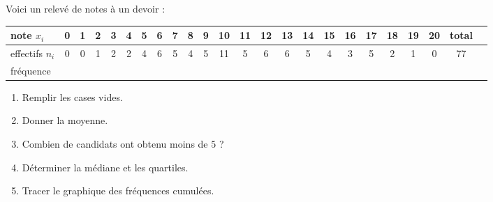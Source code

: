 
\begin{exercice}\label{exoSeconde-0014}

    Voici un relevé de notes à un devoir :
    \begin{center}
        \begin{tabular}{|l||c|c|c|c|c|c|c|c|c|c|c|c|c|c|c|c|c|c|c|c|c|c||c|}
            \hline
            note \( x_i\)&0&1&2&3&4&5&6&7&8&9&10&11&12&13&14&15&16&17&18&19&20&total\\
            \hline
            effectifs \( n_i\)&0&0&1&2&2&4&6&5&4&5&11&5&6&6&5&4&3&5&2&1&0&77\\
            \hline
            fréquence&&&&&&&&&&&&&&&&&&&&&&\\
            \hline
        \end{tabular}
    \end{center}
    \begin{multicols}{2}
        \begin{enumerate}
            \item
                Remplir les cases vides.
            \item
                Donner la moyenne.
            \item
                Combien de candidats ont obtenu moins de \( 5\) ?
            \item
                Déterminer la médiane et les quartiles.
            \item
                Tracer le graphique des fréquences cumulées.
        \end{enumerate}
    \end{multicols}

\end{exercice}
